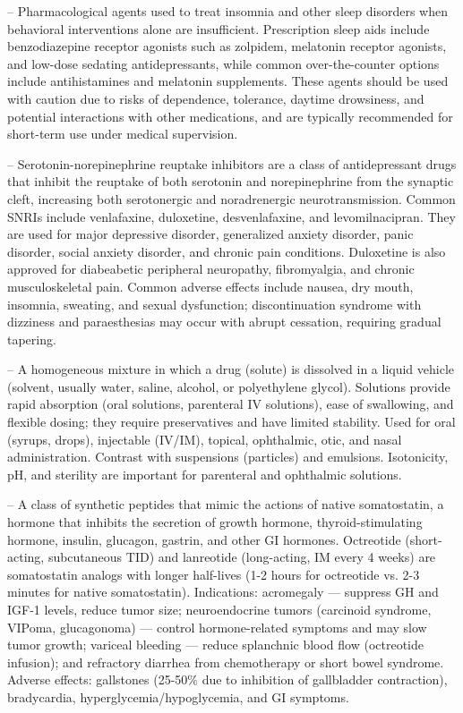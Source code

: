 -- Pharmacological agents used to treat insomnia and other sleep disorders when behavioral interventions alone are insufficient. Prescription sleep aids include benzodiazepine receptor agonists such as zolpidem, melatonin receptor agonists, and low-dose sedating antidepressants, while common over-the-counter options include antihistamines and melatonin supplements. These agents should be used with caution due to risks of dependence, tolerance, daytime drowsiness, and potential interactions with other medications, and are typically recommended for short-term use under medical supervision.

-- Serotonin-norepinephrine reuptake inhibitors are a class of antidepressant drugs that inhibit the reuptake of both serotonin and norepinephrine from the synaptic cleft, increasing both serotonergic and noradrenergic neurotransmission. Common SNRIs include venlafaxine, duloxetine, desvenlafaxine, and levomilnacipran. They are used for major depressive disorder, generalized anxiety disorder, panic disorder, social anxiety disorder, and chronic pain conditions. Duloxetine is also approved for diabeabetic peripheral neuropathy, fibromyalgia, and chronic musculoskeletal pain. Common adverse effects include nausea, dry mouth, insomnia, sweating, and sexual dysfunction; discontinuation syndrome with dizziness and paraesthesias may occur with abrupt cessation, requiring gradual tapering.

-- A homogeneous mixture in which a drug (solute) is dissolved in a liquid vehicle (solvent, usually water, saline, alcohol, or polyethylene glycol). Solutions provide rapid absorption (oral solutions, parenteral IV solutions), ease of swallowing, and flexible dosing; they require preservatives and have limited stability. Used for oral (syrups, drops), injectable (IV/IM), topical, ophthalmic, otic, and nasal administration. Contrast with suspensions (particles) and emulsions. Isotonicity, pH, and sterility are important for parenteral and ophthalmic solutions.

-- A class of synthetic peptides that mimic the actions of native somatostatin, a hormone that inhibits the secretion of growth hormone, thyroid-stimulating hormone, insulin, glucagon, gastrin, and other GI hormones. Octreotide (short-acting, subcutaneous TID) and lanreotide (long-acting, IM every 4 weeks) are somatostatin analogs with longer half-lives (1-2 hours for octreotide vs. 2-3 minutes for native somatostatin). Indications: acromegaly — suppress GH and IGF-1 levels, reduce tumor size; neuroendocrine tumors (carcinoid syndrome, VIPoma, glucagonoma) — control hormone-related symptoms and may slow tumor growth; variceal bleeding — reduce splanchnic blood flow (octreotide infusion); and refractory diarrhea from chemotherapy or short bowel syndrome. Adverse effects: gallstones (25-50\% due to inhibition of gallbladder contraction), bradycardia, hyperglycemia/hypoglycemia, and GI symptoms.


